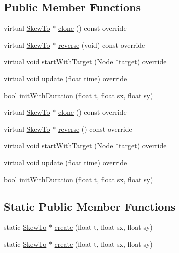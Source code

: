 \subsection*{Public Member Functions}
\begin{DoxyCompactItemize}
\item 
virtual \hyperlink{classSkewTo}{Skew\+To} $\ast$ \hyperlink{classSkewTo_a9d7fb4b11a50457b43453cfdd5753231}{clone} () const override
\item 
virtual \hyperlink{classSkewTo}{Skew\+To} $\ast$ \hyperlink{classSkewTo_a4e35b4a1e7572f0c74c8d7684f02f3fd}{reverse} (void) const override
\item 
virtual void \hyperlink{classSkewTo_a43613e8ef08aead6e3dab8d27dda7c0e}{start\+With\+Target} (\hyperlink{classNode}{Node} $\ast$target) override
\item 
virtual void \hyperlink{classSkewTo_ae307437cb6dee495f55dd350ccccd1c4}{update} (float time) override
\item 
bool \hyperlink{classSkewTo_a54f300d6317d235cf978e871f9286c9f}{init\+With\+Duration} (float t, float sx, float sy)
\item 
virtual \hyperlink{classSkewTo}{Skew\+To} $\ast$ \hyperlink{classSkewTo_a7959089aa46cca257a931b4f6d806679}{clone} () const override
\item 
virtual \hyperlink{classSkewTo}{Skew\+To} $\ast$ \hyperlink{classSkewTo_acdbc6d19ee729b69ab097e449d09379f}{reverse} () const override
\item 
virtual void \hyperlink{classSkewTo_a16355f6807f0100f4e52ed8ad5e84116}{start\+With\+Target} (\hyperlink{classNode}{Node} $\ast$target) override
\item 
virtual void \hyperlink{classSkewTo_a85d6a656272bcb08a97a7d98d0fa4f06}{update} (float time) override
\item 
bool \hyperlink{classSkewTo_a54f300d6317d235cf978e871f9286c9f}{init\+With\+Duration} (float t, float sx, float sy)
\end{DoxyCompactItemize}
\subsection*{Static Public Member Functions}
\begin{DoxyCompactItemize}
\item 
static \hyperlink{classSkewTo}{Skew\+To} $\ast$ \hyperlink{classSkewTo_a14e4a0d8fc9d74ccad91f37a56f448ad}{create} (float t, float sx, float sy)
\item 
static \hyperlink{classSkewTo}{Skew\+To} $\ast$ \hyperlink{classSkewTo_a81f19938712346e4a7382549718a5d79}{create} (float t, float sx, float sy)
\end{DoxyCompactItemize}
